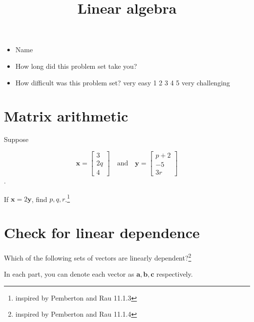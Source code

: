 \documentclass[
]{article}
\title{Linear algebra}
\author{}
\date{\vspace{-2.5em}}
\begin{document}
\maketitle

\begin{itemize}
\item
  Name
\item
  How long did this problem set take you?
\item
  How difficult was this problem set? very easy 1 2 3 4 5 very
  challenging
\end{itemize}

\section{Matrix arithmetic}\label{matrix-arithmetic}

Suppose

\[\mathbf{x} = \begin{bmatrix}
    3 \\
    2q \\
    4
\end{bmatrix} \quad \mbox{and} \quad \mathbf{y} = \begin{bmatrix}
    p + 2 \\
    -5 \\
    3r
\end{bmatrix}\].

If \(\mathbf{x} = 2 \mathbf{y}\), find \(p, q, r\).\footnote{inspired by
  Pemberton and Rau 11.1.3}

\section{Check for linear dependence}\label{check-for-linear-dependence}

Which of the following sets of vectors are linearly
dependent?\footnote{inspired by Pemberton and Rau 11.1.4}

In each part, you can denote each vector as
\(\mathbf{a}, \mathbf{b}, \mathbf{c}\) respectively.
\end{document}
